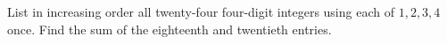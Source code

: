 List in increasing order all twenty-four four-digit integers using each of $1,2,3,4$ once. Find the sum of the eighteenth and twentieth entries.
